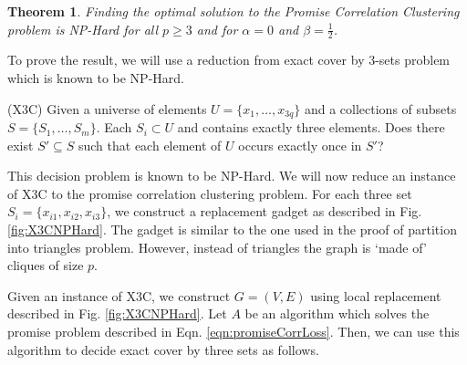 \documentclass[12pt]{article}
\newtheorem{theorem}{Theorem}
\begin{document}
\begin{figure*}[!ht]
\caption{Part of graph $G$ constructed for the subset $S_i =  \{x_{i1}, x_{i2}, x_{i3}\}$. The graph is constructed by local replacement when for $p = 4$. If $S_i$ is included in the exact cover then the edges colored black and the edges colored blue represent the corresponding clustering of this part of the graph $G$. If $S_i$ is not included in the exact cover then the edges colored red and the edges colored black represent the clustering of this part of the graph.}
\label{fig:X3CNPHard}
\end{figure*}

\begin{theorem}
Finding the optimal solution to the Promise Correlation Clustering problem is NP-Hard for all $p \ge 3$ and for $\alpha = 0$ and $\beta = \frac{1}{2}$.  
\end{theorem}

\noindent To prove the result, we will use a reduction from exact cover by $3$-sets problem which is known to be NP-Hard.

(X3C) Given a universe of elements $U = \{x_1, \ldots, x_{3q}\}$ and a collections of subsets $S = \{S_1, \ldots, S_m\}$. Each $S_i \subset U$ and contains exactly three elements. Does there exist $S' \subseteq S$ such that each element of $U$ occurs exactly once in $S'$?

This decision problem is known to be NP-Hard. We will now reduce an instance of X3C to the promise correlation clustering problem. For each three set $S_i = \{x_{i1}, x_{i2}, x_{i3}\}$, we construct a replacement gadget as described in Fig. \ref{fig:X3CNPHard}. The gadget is similar to the one used in the proof of partition into triangles problem. However, instead of triangles the graph is `made of' cliques of size $p$. 

Given an instance of X3C, we construct $G = (V, E)$ using local replacement described in Fig. \ref{fig:X3CNPHard}. Let $A$ be an algorithm which solves the promise problem described in Eqn. \ref{eqn:promiseCorrLoss}. Then, we can use this algorithm to decide exact cover by three sets as follows.
\end{document}

